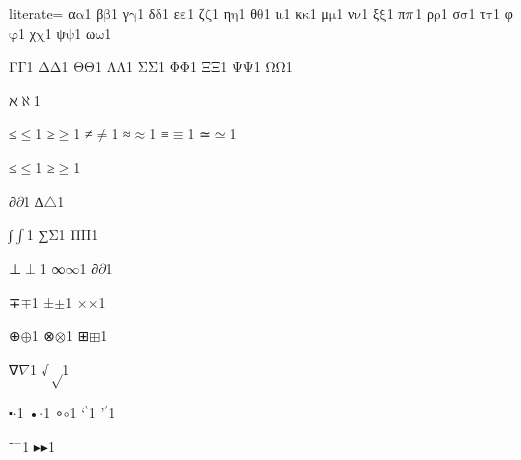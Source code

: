 {%
literate=
{α}{{\ensuremath{\mathrm{\alpha}}}}1
{β}{{\ensuremath{\mathrm{\beta}}}}1
{γ}{{\ensuremath{\mathrm{\gamma}}}}1
{δ}{{\ensuremath{\mathrm{\delta}}}}1
{ε}{{\ensuremath{\mathrm{\varepsilon}}}}1
{ζ}{{\ensuremath{\mathrm{\zeta}}}}1
{η}{{\ensuremath{\mathrm{\eta}}}}1
{θ}{{\ensuremath{\mathrm{\theta}}}}1
{ι}{{\ensuremath{\mathrm{\iota}}}}1
{κ}{{\ensuremath{\mathrm{\kappa}}}}1
{μ}{{\ensuremath{\mathrm{\mu}}}}1
{ν}{{\ensuremath{\mathrm{\nu}}}}1
{ξ}{{\ensuremath{\mathrm{\xi}}}}1
{π}{{\ensuremath{\mathrm{\mathnormal{\pi}}}}}1
{ρ}{{\ensuremath{\mathrm{\rho}}}}1
{σ}{{\ensuremath{\mathrm{\sigma}}}}1
{τ}{{\ensuremath{\mathrm{\tau}}}}1
{φ}{{\ensuremath{\mathrm{\varphi}}}}1
{χ}{{\ensuremath{\mathrm{\chi}}}}1
{ψ}{{\ensuremath{\mathrm{\psi}}}}1
{ω}{{\ensuremath{\mathrm{\omega}}}}1

{Γ}{{\ensuremath{\mathrm{\Gamma}}}}1
{Δ}{{\ensuremath{\mathrm{\Delta}}}}1
{Θ}{{\ensuremath{\mathrm{\Theta}}}}1
{Λ}{{\ensuremath{\mathrm{\Lambda}}}}1
{Σ}{{\ensuremath{\mathrm{\Sigma}}}}1
{Φ}{{\ensuremath{\mathrm{\Phi}}}}1
{Ξ}{{\ensuremath{\mathrm{\Xi}}}}1
{Ψ}{{\ensuremath{\mathrm{\Psi}}}}1
{Ω}{{\ensuremath{\mathrm{\Omega}}}}1

{ℵ}{{\ensuremath{\aleph}}}1

{≤}{{\ensuremath{\leq}}}1
{≥}{{\ensuremath{\geq}}}1
{≠}{{\ensuremath{\neq}}}1
{≈}{{\ensuremath{\approx}}}1
{≡}{{\ensuremath{\equiv}}}1
{≃}{{\ensuremath{\simeq}}}1

{≤}{{\ensuremath{\leq}}}1
{≥}{{\ensuremath{\geq}}}1

{∂}{{\ensuremath{\partial}}}1
{∆}{{\ensuremath{\triangle}}}1 %

{∫}{{\ensuremath{\int}}}1
{∑}{{\ensuremath{\mathrm{\Sigma}}}}1
{Π}{{\ensuremath{\mathrm{\Pi}}}}1

{⊥}{{\ensuremath{\perp}}}1
{∞}{{\ensuremath{\infty}}}1
{∂}{{\ensuremath{\partial}}}1

{∓}{{\ensuremath{\mp}}}1
{±}{{\ensuremath{\pm}}}1
{×}{{\ensuremath{\times}}}1

{⊕}{{\ensuremath{\oplus}}}1
{⊗}{{\ensuremath{\otimes}}}1
{⊞}{{\ensuremath{\boxplus}}}1

{∇}{{\ensuremath{\nabla}}}1
{√}{{\ensuremath{\sqrt}}}1

{⬝}{{\ensuremath{\cdot}}}1
{•}{{\ensuremath{\cdot}}}1
{∘}{{\ensuremath{\circ}}}1
{`}{{\ensuremath{{}^\backprime}}}1
{'}{{\ensuremath{{}^\prime}}}1

{⁻}{{\ensuremath{^{-}}}}1
{▸}{{\ensuremath{\blacktriangleright}}}1

}
